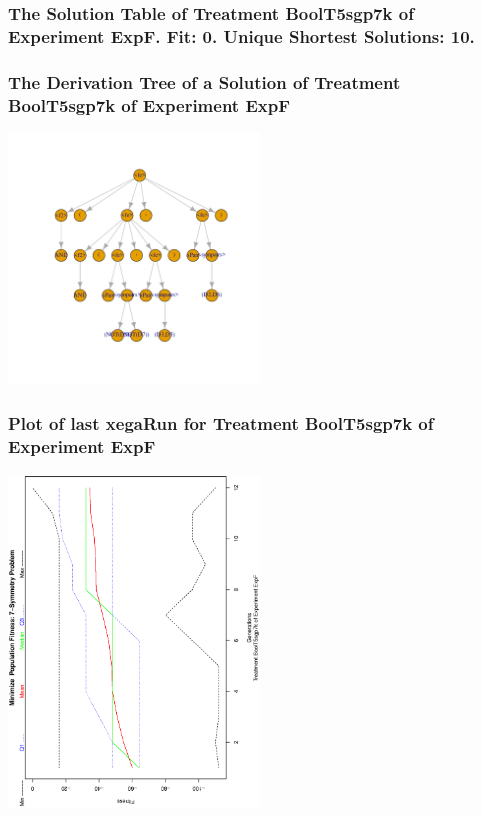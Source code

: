 \documentclass[18pt,c]{beamer}
\begin{document}
 \begin{frame}
 \fontsize{8pt}{9pt}\selectfont
 \frametitle{ The Solution Table of Treatment BoolT5sgp7k of Experiment ExpF. Fit: 0. Unique Shortest Solutions: 10. }

 \label{ExpFSolutionTable008.tex}  
 \end{frame}

 \begin{frame}
 \frametitle{ The Derivation Tree of a Solution of Treatment BoolT5sgp7k of Experiment ExpF }
 \begin{center}
\includegraphics[width=0.5\textwidth, angle=0]
{ExpFDerivationTreeFigure008.pdf}
 \end{center}
 \label{report/ExpFDerivationTreeFigure008.pdf}  
 \end{frame}

 \begin{frame}
 \frametitle{ Plot of last xegaRun for Treatment BoolT5sgp7k of Experiment ExpF }
 \begin{center}
\includegraphics[width=0.5\textwidth, angle=-90]
{ExpFPlotPopStatsFigure008.eps}
 \end{center}
 \label{report/ExpFPlotPopStatsFigure008.eps}  
 \end{frame}
\end{document}
